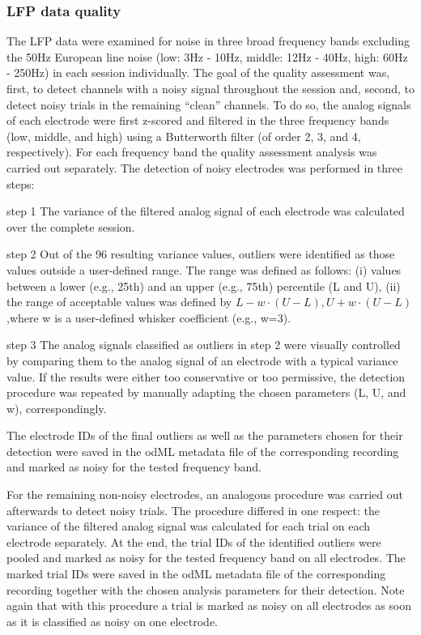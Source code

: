 {\subsubsection{LFP data quality}

The LFP data were examined for noise in three broad frequency bands excluding the 50Hz European line noise (low: 3Hz - 10Hz, middle: 12Hz - 40Hz, high: 60Hz - 250Hz) in each session individually. The goal of the quality assessment was, first, to detect channels with a noisy signal throughout the session and, second, to detect noisy trials in the remaining “clean” channels. To do so, the analog signals of each electrode were first z-scored and filtered in the three frequency bands (low, middle, and high) using a Butterworth filter (of order 2, 3, and 4, respectively). For each frequency band the quality assessment analysis was carried out separately. The detection of noisy electrodes was performed in three steps: 

step 1 The variance of the filtered analog signal of each electrode was calculated over the complete session. 

step 2 Out of the 96 resulting variance values, outliers were identified as those values outside a user-defined range. The range was defined as follows: (i) values between a lower (e.g., 25th) and an upper (e.g., 75th) percentile (L and U), (ii) the range of acceptable values was defined by $L-w\cdot(U-L),U+w\cdot(U-L)$,where w is a user-defined whisker coefficient (e.g., w=3). 

step 3 The analog signals classified as outliers in step 2 were visually controlled by comparing them to the analog signal of an electrode with a typical variance value. If the results were either too conservative or too permissive, the detection procedure was repeated by manually adapting the chosen parameters (L, U, and w), correspondingly. 

The electrode IDs of the final outliers as well as the parameters chosen for their detection were saved in the odML metadata file of the corresponding recording and marked as noisy for the tested frequency band. 

For the remaining non-noisy electrodes, an analogous procedure was carried out afterwards to detect noisy trials. The procedure differed in one respect: the variance of the filtered analog signal was calculated for each trial on each electrode separately. At the end, the trial IDs of the identified outliers were pooled and marked as noisy for the tested frequency band on all electrodes. The marked trial IDs were saved in the odML metadata file of the corresponding recording together with the chosen analysis parameters for their detection. Note again that with this procedure a trial is marked as noisy on all electrodes as soon as it is classified as noisy on one electrode.

}
